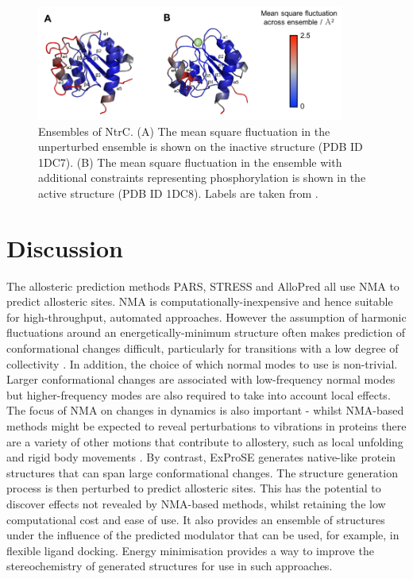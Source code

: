 \begin{figure}
\centering

\includegraphics[width=0.9\textwidth]{figures/ntrc/ntrc}

\caption{Ensembles of NtrC.
(A) The mean square fluctuation in the unperturbed ensemble is shown on the inactive structure (PDB ID 1DC7).
(B) The mean square fluctuation in the ensemble with additional constraints representing phosphorylation is shown in the active structure (PDB ID 1DC8).
Labels are taken from \cite{Volkman2001}.}

\label{fig:ntrc}
\end{figure}


\section{Discussion}

The allosteric prediction methods PARS, STRESS and AlloPred all use NMA to predict allosteric sites.
NMA is computationally-inexpensive and hence suitable for high-throughput, automated approaches.
However the assumption of harmonic fluctuations around an energetically-minimum structure often makes prediction of conformational changes difficult, particularly for transitions with a low degree of collectivity \cite{Yang2007}.
In addition, the choice of which normal modes to use is non-trivial.
Larger conformational changes are associated with low-frequency normal modes but higher-frequency modes are also required to take into account local effects.
The focus of NMA on changes in dynamics is also important - whilst NMA-based methods might be expected to reveal perturbations to vibrations in proteins there are a variety of other motions that contribute to allostery, such as local unfolding and rigid body movements \cite{Motlagh2014}.
By contrast, ExProSE generates native-like protein structures that can span large conformational changes.
The structure generation process is then perturbed to predict allosteric sites.
This has the potential to discover effects not revealed by NMA-based methods, whilst retaining the low computational cost and ease of use.
It also provides an ensemble of structures under the influence of the predicted modulator that can be used, for example, in flexible ligand docking.
Energy minimisation provides a way to improve the stereochemistry of generated structures for use in such approaches.


